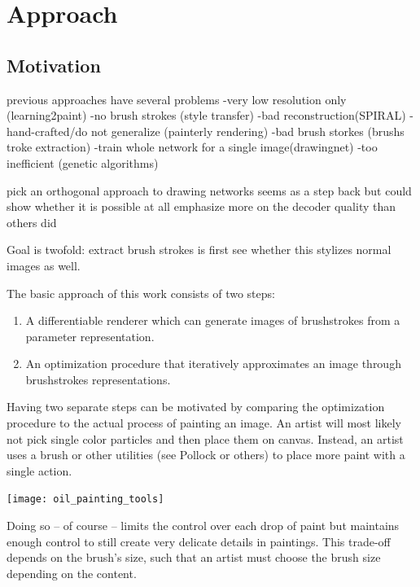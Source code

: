 \setchapterpreamble[u]{\margintoc}
\chapter{Approach}


\section{Motivation}

previous approaches have several problems
-very low resolution only (learning2paint)
-no brush strokes (style transfer)
-bad reconstruction(SPIRAL)
-hand-crafted/do not generalize (painterly rendering)
-bad brush storkes (brushs troke extraction)
-train whole network for a single image(drawingnet)
-too inefficient (genetic algorithms)

pick an orthogonal approach to drawing networks
seems as a step back but could show whether it is possible at all
emphasize more on the decoder quality than others did

Goal is twofold: extract brush strokes is first
see whether this stylizes normal images as well.


The basic approach of this work consists of two steps:
\begin{enumerate}
    \item A differentiable renderer which can generate images of brushstrokes from a parameter representation.
    \item An optimization procedure that iteratively approximates an image through brushstrokes representations.
\end{enumerate}

Having two separate steps can be motivated by comparing the optimization procedure to the actual process of painting an image.
An artist will most likely not pick single color particles and then place them on canvas.
Instead, an artist uses a brush or other utilities (see Pollock or others) to place more paint with a single action.

\begin{marginfigure}
    \texttt{[image: oil\_painting\_tools]}
    \caption[]{A typical set of brushes and spatulas used for oil paintings.
    }
\end{marginfigure}
Doing so -- of course -- limits the control over each drop of paint but maintains enough control to still create very delicate details in paintings.
This trade-off depends on the brush's size, such that an artist must choose the brush size depending on the content.

